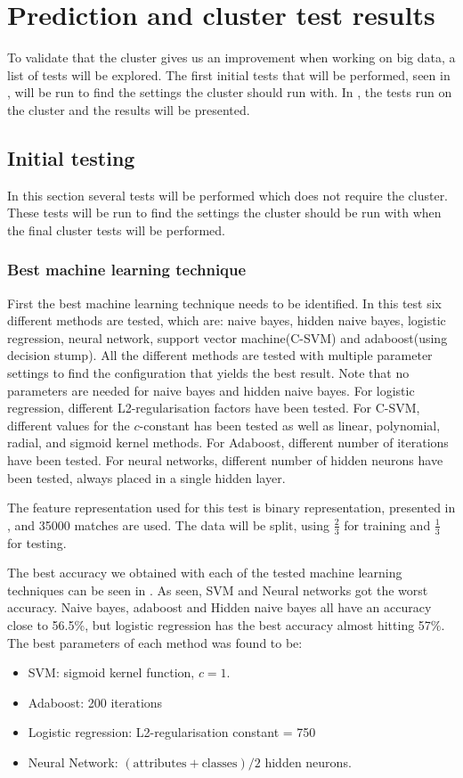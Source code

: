 \section{Prediction and cluster test results}\label{sec:testing}
To validate that the cluster gives us an improvement when working on big data, a list of tests will be explored. The first initial tests that will be performed, seen in , will be run to find the settings the cluster should run with. In , the tests run on the cluster and the results will be presented.

\subsection{Initial testing}\label{sec:initialtest}
In this section several tests will be performed which does not require the cluster. These tests will be run to find the settings the cluster should be run with when the final cluster tests will be performed.

\subsubsection{Best machine learning technique}
First the best machine learning technique needs to be identified. In this test six different methods are tested, which are: naive bayes, hidden naive bayes, logistic regression, neural network, support vector machine(C-SVM) and adaboost(using decision stump). All the different methods are tested with multiple parameter settings to find the configuration that yields the best result. Note that no parameters are needed for naive bayes and hidden naive bayes. For logistic regression, different L2-regularisation factors have been tested. For C-SVM, different values for the $c$-constant has been tested as well as linear, polynomial, radial, and sigmoid kernel methods. For Adaboost, different number of iterations have been tested. For neural networks, different number of hidden neurons have been tested, always placed in a single hidden layer.

The feature representation used for this test is binary representation, presented in , and 35000 matches are used. The data will be split, using $\frac{2}{3}$ for training and $\frac{1}{3}$ for testing. 

The best accuracy we obtained with each of the tested machine learning techniques can be seen in . As seen, SVM and Neural networks got the worst accuracy. Naive bayes, adaboost and Hidden naive bayes all have an accuracy close to 56.5\%, but logistic regression has the best accuracy almost hitting 57\%.
The best parameters of each method was found to be:
\begin{itemize}
\item SVM: sigmoid kernel function, $c = 1$.
\item Adaboost: 200 iterations
\item Logistic regression: L2-regularisation constant = 750
\item Neural Network: $(\text{attributes} + \text{classes}) / 2$ hidden neurons.
\end{itemize}

